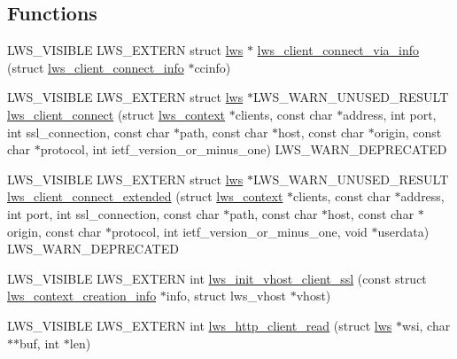 \subsection*{Functions}
\begin{DoxyCompactItemize}
\item 
L\+W\+S\+\_\+\+V\+I\+S\+I\+B\+LE L\+W\+S\+\_\+\+E\+X\+T\+E\+RN struct \hyperlink{structlws}{lws} $\ast$ \hyperlink{group__client_ga0c966136905f467816307cfba6deb5fd}{lws\+\_\+client\+\_\+connect\+\_\+via\+\_\+info} (struct \hyperlink{structlws__client__connect__info}{lws\+\_\+client\+\_\+connect\+\_\+info} $\ast$ccinfo)
\item 
L\+W\+S\+\_\+\+V\+I\+S\+I\+B\+LE L\+W\+S\+\_\+\+E\+X\+T\+E\+RN struct \hyperlink{structlws}{lws} $\ast$L\+W\+S\+\_\+\+W\+A\+R\+N\+\_\+\+U\+N\+U\+S\+E\+D\+\_\+\+R\+E\+S\+U\+LT \hyperlink{group__client_ga4af0a20108a95e8b6d94dd4d80055ff3}{lws\+\_\+client\+\_\+connect} (struct \hyperlink{structlws__context}{lws\+\_\+context} $\ast$clients, const char $\ast$address, int port, int ssl\+\_\+connection, const char $\ast$path, const char $\ast$host, const char $\ast$origin, const char $\ast$protocol, int ietf\+\_\+version\+\_\+or\+\_\+minus\+\_\+one) L\+W\+S\+\_\+\+W\+A\+R\+N\+\_\+\+D\+E\+P\+R\+E\+C\+A\+T\+ED
\item 
L\+W\+S\+\_\+\+V\+I\+S\+I\+B\+LE L\+W\+S\+\_\+\+E\+X\+T\+E\+RN struct \hyperlink{structlws}{lws} $\ast$L\+W\+S\+\_\+\+W\+A\+R\+N\+\_\+\+U\+N\+U\+S\+E\+D\+\_\+\+R\+E\+S\+U\+LT \hyperlink{group__client_gac6a8558b4410961a880241c2ac1271e2}{lws\+\_\+client\+\_\+connect\+\_\+extended} (struct \hyperlink{structlws__context}{lws\+\_\+context} $\ast$clients, const char $\ast$address, int port, int ssl\+\_\+connection, const char $\ast$path, const char $\ast$host, const char $\ast$origin, const char $\ast$protocol, int ietf\+\_\+version\+\_\+or\+\_\+minus\+\_\+one, void $\ast$userdata) L\+W\+S\+\_\+\+W\+A\+R\+N\+\_\+\+D\+E\+P\+R\+E\+C\+A\+T\+ED
\item 
L\+W\+S\+\_\+\+V\+I\+S\+I\+B\+LE L\+W\+S\+\_\+\+E\+X\+T\+E\+RN int \hyperlink{group__client_ga4f44b8230e6732816ca5cd8d1aaaf340}{lws\+\_\+init\+\_\+vhost\+\_\+client\+\_\+ssl} (const struct \hyperlink{structlws__context__creation__info}{lws\+\_\+context\+\_\+creation\+\_\+info} $\ast$info, struct lws\+\_\+vhost $\ast$vhost)
\item 
L\+W\+S\+\_\+\+V\+I\+S\+I\+B\+LE L\+W\+S\+\_\+\+E\+X\+T\+E\+RN int \hyperlink{group__client_ga4450c34200bf9dab3beb90ef23221870}{lws\+\_\+http\+\_\+client\+\_\+read} (struct \hyperlink{structlws}{lws} $\ast$wsi, char $\ast$$\ast$buf, int $\ast$len)
$$
\end{DoxyCompactItemize}
